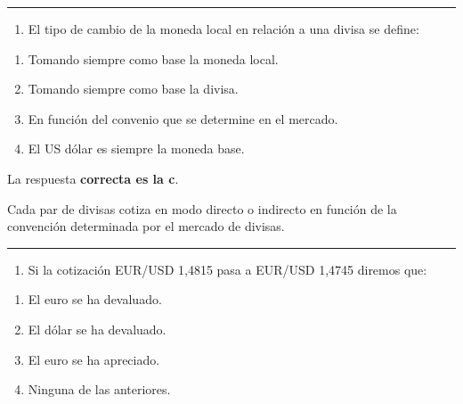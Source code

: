 \documentclass[
  letterpaper,
  DIV=11,
  numbers=noendperiod]{scrreprt}
\providecommand{\tightlist}{%
  \setlength{\itemsep}{0pt}\setlength{\parskip}{0pt}}\usepackage{longtable,booktabs,array}
\begin{document}
\begin{center}\rule{0.5\linewidth}{0.5pt}\end{center}

\begin{enumerate}
\def\labelenumi{\arabic{enumi}.}
\setcounter{enumi}{41}
\tightlist
\item
  El tipo de cambio de la moneda local en relación a una divisa se
  define:
\end{enumerate}

\begin{enumerate}
\def\labelenumi{\alph{enumi}.}
\item
  Tomando siempre como base la moneda local.
\item
  Tomando siempre como base la divisa.
\item
  En función del convenio que se determine en el mercado.
\item
  El US dólar es siempre la moneda base.
\end{enumerate}

\begin{tcolorbox}[enhanced jigsaw, left=2mm, opacityback=0, colback=white, breakable, arc=.35mm, bottomrule=.15mm, rightrule=.15mm, toprule=.15mm, leftrule=.75mm, colframe=quarto-callout-tip-color-frame]
\begin{minipage}[t]{5.5mm}
\textcolor{quarto-callout-tip-color}{\faLightbulb}
\end{minipage}%
\begin{minipage}[t]{\textwidth - 5.5mm}

La respuesta \textbf{correcta es la c}.

Cada par de divisas cotiza en modo directo o indirecto en función de la
convención determinada por el mercado de divisas.

\end{minipage}%
\end{tcolorbox}

\begin{center}\rule{0.5\linewidth}{0.5pt}\end{center}

\begin{enumerate}
\def\labelenumi{\arabic{enumi}.}
\setcounter{enumi}{42}
\tightlist
\item
  Si la cotización EUR/USD 1,4815 pasa a EUR/USD 1,4745 diremos que:
\end{enumerate}

\begin{enumerate}
\def\labelenumi{\alph{enumi}.}
\item
  El euro se ha devaluado.
\item
  El dólar se ha devaluado.
\item
  El euro se ha apreciado.
\item
  Ninguna de las anteriores.
\end{enumerate}
\end{document}
